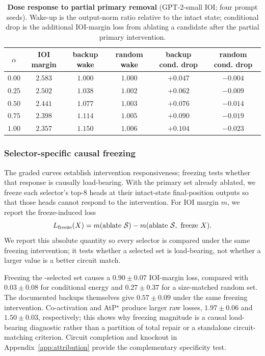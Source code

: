 \begin{table}[ht]
\centering
\small
\setlength{\tabcolsep}{4pt}
\caption{\textbf{Dose response to partial primary removal} (GPT-2-small IOI; four prompt seeds).
Wake-up is the output-norm ratio relative to the intact state; conditional drop is the additional IOI-margin loss from ablating a candidate after the partial primary intervention.}
\label{tab:dose}
\begin{tabular}{cccccc}
\toprule
\rowcolor{hdr}
$\alpha$ & IOI margin & backup wake & random wake & backup cond. drop & random cond. drop \\
\midrule
$0.00$ & $2.583$ & $1.000$ & $1.000$ & $+0.047$ & $-0.004$ \\
$0.25$ & $2.502$ & $1.038$ & $1.002$ & $+0.062$ & $-0.009$ \\
$0.50$ & $2.441$ & $1.077$ & $1.003$ & $+0.076$ & $-0.014$ \\
$0.75$ & $2.398$ & $1.114$ & $1.005$ & $+0.090$ & $-0.019$ \\
$1.00$ & $2.357$ & $1.150$ & $1.006$ & $+0.104$ & $-0.023$ \\
\bottomrule
\end{tabular}
\end{table}


\subsubsection{Selector-specific causal freezing}
\label{app:freezesel}

The graded curves establish intervention responsiveness; freezing tests whether that response is causally load-bearing.
With the primary set already ablated, we freeze each selector's top-$8$ heads at their intact-state final-position outputs so that those heads cannot respond to the intervention.
For IOI margin $m$, we report the freeze-induced loss
\begin{equation}
L_{\mathrm{freeze}}(X)
=
m(\text{ablate }\mathcal{S})
-
m(\text{ablate }\mathcal{S},\text{ freeze }X).
\label{eq:freezeloss}
\end{equation}
We report this absolute quantity so every selector is compared under the same freezing intervention; it tests whether a selected set is load-bearing, not whether a larger value is a better circuit match.

Freezing the \coax-selected set causes a $0.90{\pm}0.07$ IOI-margin loss, compared with $0.03{\pm}0.08$ for conditional energy and $0.27{\pm}0.37$ for a size-matched random set.
The documented backups themselves give $0.57{\pm}0.09$ under the same freezing intervention.
Co-activation and AtP$^\star$ produce larger raw losses, $1.97{\pm}0.06$ and $1.50{\pm}0.03$, respectively; this shows why freezing magnitude is a causal load-bearing diagnostic rather than a partition of total repair or a standalone circuit-matching criterion.
Circuit completion and knockout in Appendix~\ref{app:attribution} provide the complementary specificity test.

